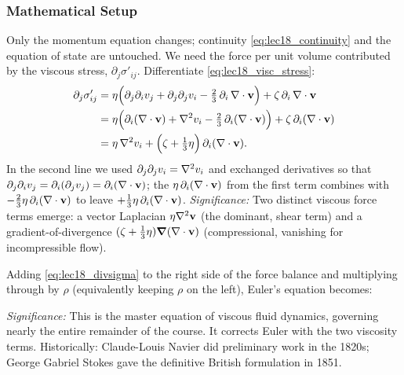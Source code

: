 \documentclass[../main.tex]{subfiles}
\begin{document}
\subsubsection*{Mathematical Setup}
Only the momentum equation changes; continuity \eqref{eq:lec18_continuity} and the equation of state are untouched. We need the force per unit volume contributed by the viscous stress, $\partial_j\sigma'_{ij}$. Differentiate \eqref{eq:lec18_visc_stress}:
\begin{align}
  \partial_j\sigma'_{ij}
  &= \eta\Big(\partial_j\partial_i v_j + \partial_j\partial_j v_i - \tfrac{2}{3}\,\partial_i\,\nabla \cdot\mathbf{v}\Big) + \zeta\,\partial_i\,\nabla \cdot\mathbf{v} \notag\\
  &= \eta\Big(\partial_i(\nabla \cdot\mathbf{v}) + \nabla^2 v_i - \tfrac{2}{3}\,\partial_i(\nabla \cdot\mathbf{v})\Big) + \zeta\,\partial_i(\nabla \cdot\mathbf{v}) \notag\\
  &= \eta\,\nabla^2 v_i + \Big(\zeta + \tfrac{1}{3}\eta\Big)\,\partial_i(\nabla \cdot\mathbf{v}).
  \label{eq:lec18_divsigma}
\end{align}
In the second line we used $\partial_j\partial_j v_i=\nabla^2 v_i$ and exchanged derivatives so that $\partial_j\partial_i v_j=\partial_i(\partial_j v_j)=\partial_i(\nabla \cdot\mathbf{v})$; the $\eta\,\partial_i(\nabla \cdot\mathbf{v})$ from the first term combines with $-\tfrac{2}{3}\eta\,\partial_i(\nabla \cdot\mathbf{v})$ to leave $+\tfrac{1}{3}\eta\,\partial_i(\nabla \cdot\mathbf{v})$.
\textit{Significance:} Two distinct viscous force terms emerge: a vector Laplacian $\eta\nabla^2\mathbf{v}$ (the dominant, shear term) and a gradient-of-divergence $(\zeta+\tfrac{1}{3}\eta)\grad(\nabla \cdot\mathbf{v})$ (compressional, vanishing for incompressible flow).

Adding \eqref{eq:lec18_divsigma} to the right side of the force balance and multiplying through by $\rho$ (equivalently keeping $\rho$ on the left), Euler's equation becomes:

\textit{Significance:} This is the master equation of viscous fluid dynamics, governing nearly the entire remainder of the course. It corrects Euler with the two viscosity terms. Historically: Claude-Louis Navier did preliminary work in the 1820s; George Gabriel Stokes gave the definitive British formulation in 1851.
\end{document}
